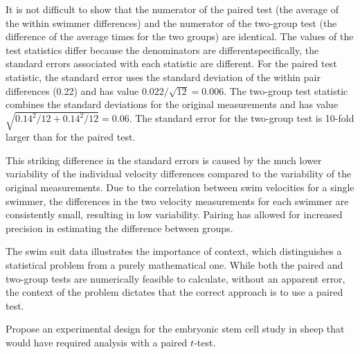 It is not difficult to show that the numerator of the paired test (the average of the within swimmer differences) and the numerator of the two-group test (the difference of the average times for the two groups) are identical. The values of the test statistics differ because the denominators are different\textemdash specifically, the standard errors associated with each statistic are different.  For the paired test statistic, the standard error uses the standard deviation of the within pair differences (0.22) and has value $0.022/\sqrt{12} = 0.006$. The two-group test statistic combines the standard deviations for the original measurements and has value $\sqrt{0.14^2/12 + 0.14^2/12} = 0.06$.  The standard error for the two-group test is 10-fold larger than for the paired test.  

This striking difference in the standard errors is caused by the much lower variability of the individual velocity differences compared to the variability of the original measurements. Due to the correlation between swim velocities for a single swimmer, the differences in the two velocity measurements for each swimmer are consistently small, resulting in low variability. Pairing has allowed for increased precision in estimating the difference between groups.

The swim suit data illustrates the importance of context, which distinguishes a statistical problem from a purely mathematical one. While both the paired and two-group tests are numerically feasible to calculate, without an apparent error, the context of the problem dictates that the correct approach is to use a paired test.

\begin{exercisewrap}
\begin{nexercise}
Propose an experimental design for the embryonic stem cell study in sheep that would have required analysis with a paired $t$-test.\footnotemark{}
\end{nexercise}
\end{exercisewrap}


\textD{\newpage}


